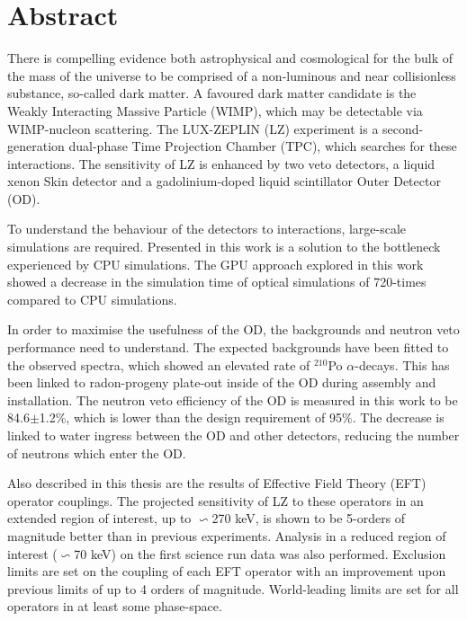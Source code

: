 %
%
%

\chapter*{Abstract}
\begin{SingleSpace}
\par
There is compelling evidence both astrophysical and cosmological for the bulk of the mass of the universe to be comprised of a non-luminous and near collisionless substance, so-called dark matter.
A favoured dark matter candidate is the Weakly Interacting Massive Particle (WIMP), which may be detectable via WIMP-nucleon scattering.
The LUX-ZEPLIN (LZ) experiment is a second-generation dual-phase Time Projection Chamber (TPC), which searches for these interactions.
The sensitivity of LZ is enhanced by two veto detectors, a liquid xenon Skin detector and a gadolinium-doped liquid scintillator Outer Detector (OD).
\par
To understand the behaviour of the detectors to interactions, large-scale simulations are required.
Presented in this work is a solution to the bottleneck experienced by CPU simulations.
The GPU approach explored in this work showed a decrease in the simulation time of optical simulations of 720-times compared to CPU simulations.
\par
In order to maximise the usefulness of the OD, the backgrounds and neutron veto performance need to understand.
The expected backgrounds have been fitted to the observed spectra, which showed an elevated rate of ${}^{210}$Po $\alpha$-decays.
This has been linked to radon-progeny plate-out inside of the OD during assembly and installation.
The neutron veto efficiency of the OD is measured in this work to be 84.6$\pm$1.2\%, which is lower than the design requirement of 95\%.
The decrease is linked to water ingress between the OD and other detectors, reducing the number of neutrons which enter the OD.
\par
Also described in this thesis are the results of Effective Field Theory (EFT) operator couplings.
The projected sensitivity of LZ to these operators in an extended region of interest, up to $\backsim$270 keV, is shown to be 5-orders of magnitude better than in previous experiments.
Analysis in a reduced region of interest ($\backsim$70 keV) on the first science run data was also performed.
Exclusion limits are set on the coupling of each EFT operator with an improvement upon previous limits of up to 4 orders of magnitude.
World-leading limits are set for all operators in at least some phase-space. 

\end{SingleSpace}
\clearpage
